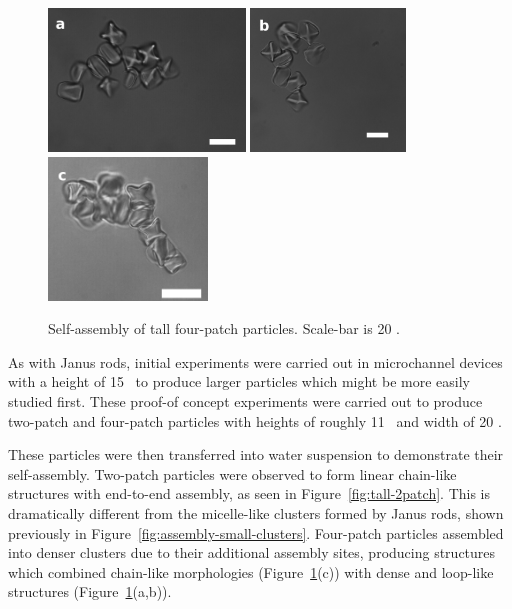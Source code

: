 \begin{figure}[h]
\begin{center}
\includegraphics[height=1.5in]{figures/complex-shapes/4patch-sb20-01.png} \includegraphics[height=1.5in]{figures/complex-shapes/4patch-sb20-02.png} \includegraphics[height=1.5in]{figures/complex-shapes/4patch-sb20-03.png}
\end{center}
\caption{Self-assembly of tall four-patch particles. Scale-bar is 20 \microns.}
\label{fig:tall-4patch}
\end{figure}

As with Janus rods, initial experiments were carried out in microchannel devices with a height of
15 \microns~to produce larger particles which might be more easily studied first.  These proof-of concept
experiments were carried out to produce two-patch and four-patch particles with heights of roughly 11
\microns~and width of 20 \microns.  

These particles were then transferred into water suspension to 
demonstrate their self-assembly.  Two-patch particles were observed to form linear chain-like structures
with end-to-end assembly, as seen in Figure~\ref{fig:tall-2patch}.  This is dramatically different from
the micelle-like clusters formed by Janus rods, shown previously in 
Figure~\ref{fig:assembly-small-clusters}.  Four-patch particles assembled into denser clusters due
to their additional assembly sites, producing structures which combined chain-like 
morphologies (Figure~\ref{fig:tall-4patch}(c)) with dense and loop-like structures 
(Figure~\ref{fig:tall-4patch}(a,b)).

